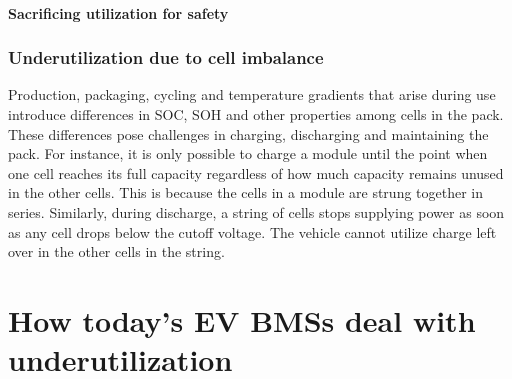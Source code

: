 		\subsubsection{Sacrificing utilization for safety}

\subsection{Underutilization due to cell imbalance}
Production, packaging, cycling and temperature gradients that arise during use introduce differences in SOC, SOH and other properties among cells in the pack. These differences pose challenges in charging, discharging and maintaining the pack. For instance, it is only possible to charge a module until the point when one cell reaches its full capacity regardless of how much  capacity remains unused in the other cells. This is because the cells in a module are strung together in series. Similarly, during discharge, a string of cells stops supplying power as soon as any cell drops below the cutoff voltage. The vehicle cannot utilize charge left over in the other cells in the string.  
%
%
\chapter{How today's EV BMSs deal with underutilization}
